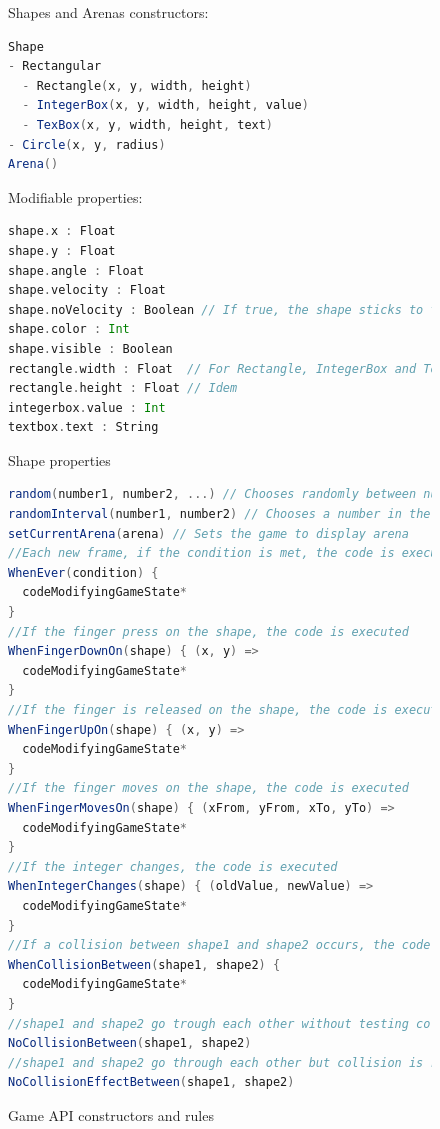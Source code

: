 \documentclass[12pt]{article} %
\begin{document}
\begin{figure}
Shapes and Arenas constructors:
\begin{lstlisting}[language=scala]
Shape
- Rectangular
  - Rectangle(x, y, width, height)
  - IntegerBox(x, y, width, height, value)
  - TexBox(x, y, width, height, text)
- Circle(x, y, radius)
Arena()
\end{lstlisting}
Modifiable properties:
\begin{lstlisting}[language=scala]
shape.x : Float
shape.y : Float
shape.angle : Float
shape.velocity : Float
shape.noVelocity : Boolean // If true, the shape sticks to the game.
shape.color : Int
shape.visible : Boolean
rectangle.width : Float  // For Rectangle, IntegerBox and TexBox
rectangle.height : Float // Idem
integerbox.value : Int
textbox.text : String
\end{lstlisting}
\caption{Shape properties\label{shapeAST}}
\end{figure}

\begin{figure}
\begin{lstlisting}[language=scala]
random(number1, number2, ...) // Chooses randomly between numbers
randomInterval(number1, number2) // Chooses a number in the interval
setCurrentArena(arena) // Sets the game to display arena
//Each new frame, if the condition is met, the code is executed
WhenEver(condition) {
  codeModifyingGameState*
}
//If the finger press on the shape, the code is executed
WhenFingerDownOn(shape) { (x, y) =>
  codeModifyingGameState*
}
//If the finger is released on the shape, the code is executed
WhenFingerUpOn(shape) { (x, y) =>
  codeModifyingGameState*
}
//If the finger moves on the shape, the code is executed
WhenFingerMovesOn(shape) { (xFrom, yFrom, xTo, yTo) =>
  codeModifyingGameState*
}
//If the integer changes, the code is executed
WhenIntegerChanges(shape) { (oldValue, newValue) =>
  codeModifyingGameState*
}
//If a collision between shape1 and shape2 occurs, the code is executed
WhenCollisionBetween(shape1, shape2) {
  codeModifyingGameState*
}
//shape1 and shape2 go trough each other without testing collision
NoCollisionBetween(shape1, shape2)
//shape1 and shape2 go through each other but collision is reported 
NoCollisionEffectBetween(shape1, shape2)
\end{lstlisting}
\caption{Game API constructors and rules\label{gameAPI}}
\end{figure}
\end{document}
